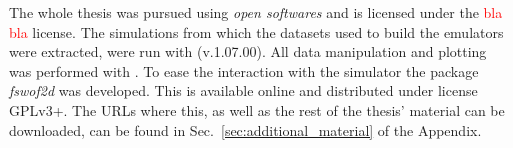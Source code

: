 The whole thesis was pursued using \emph{open softwares} and is licensed under the \textcolor{red}{bla bla}  license.
The simulations from which the datasets used to build the emulators were extracted, were run with  (v.1.07.00).
All data manipulation and plotting was performed with .
To ease the interaction with the simulator the  package \emph{fswof2d} was developed.
This is available online and distributed under license GPLv3+.
The URLs where this, as well as the rest of the thesis' material can be downloaded, can be found in Sec.~\ref{sec:additional_material} of the Appendix.




















